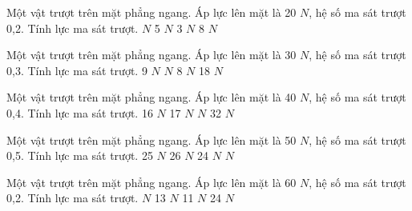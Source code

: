 

\begin{ex}
Một vật trượt trên mặt phẳng ngang. Áp lực lên mặt là 20 $N$, hệ số ma sát trượt 0,2. Tính lực ma sát trượt.
\choice
{ $N$}
{5 $N$}
{3 $N$}
{8 $N$}
\end{ex}

\begin{ex}
Một vật trượt trên mặt phẳng ngang. Áp lực lên mặt là 30 $N$, hệ số ma sát trượt 0,3. Tính lực ma sát trượt.
\choice
{9 $N$}
{ $N$}
{8 $N$}
{18 $N$}
\end{ex}

\begin{ex}
Một vật trượt trên mặt phẳng ngang. Áp lực lên mặt là 40 $N$, hệ số ma sát trượt 0,4. Tính lực ma sát trượt.
\choice
{16 $N$}
{17 $N$}
{ $N$}
{32 $N$}
\end{ex}

\begin{ex}
Một vật trượt trên mặt phẳng ngang. Áp lực lên mặt là 50 $N$, hệ số ma sát trượt 0,5. Tính lực ma sát trượt.
\choice
{25 $N$}
{26 $N$}
{24 $N$}
{ $N$}
\end{ex}

\begin{ex}
Một vật trượt trên mặt phẳng ngang. Áp lực lên mặt là 60 $N$, hệ số ma sát trượt 0,2. Tính lực ma sát trượt.
\choice
{ $N$}
{13 $N$}
{11 $N$}
{24 $N$}
\end{ex}

